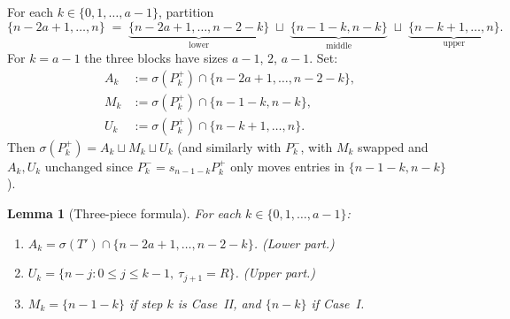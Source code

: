 \documentclass[11pt]{article}
\newtheorem{lemma}[theorem]{Lemma}
\theoremstyle{definition}
\begin{document}
For each $k\in\{0,1,\ldots,a-1\}$, partition
\[
   \{n-2a+1,\ldots,n\}\;=\;
   \underbrace{\{n-2a+1,\ldots,n-2-k\}}_{\text{lower}}
   \;\sqcup\;
   \underbrace{\{n-1-k,n-k\}}_{\text{middle}}
   \;\sqcup\;
   \underbrace{\{n-k+1,\ldots,n\}}_{\text{upper}}.
\]
For $k=a-1$ the three blocks have sizes $a-1$, $2$, $a-1$.  Set:
\begin{align}
   A_k & := \sigma(P_k^+)\cap\{n-2a+1,\ldots,n-2-k\}, \\
   M_k & := \sigma(P_k^+)\cap\{n-1-k,n-k\}, \\
   U_k & := \sigma(P_k^+)\cap\{n-k+1,\ldots,n\}.
\end{align}
Then $\sigma(P_k^+)=A_k\sqcup M_k\sqcup U_k$ (and similarly with
$P_k^-$, with $M_k$ swapped and $A_k,U_k$ unchanged since
$P_k^-=s_{n-1-k}P_k^+$ only moves entries in $\{n-1-k,n-k\}$).

\begin{lemma}[Three-piece formula]\label{lem:three-piece}
For each $k\in\{0,1,\ldots,a-1\}$:
\begin{enumerate}[leftmargin=2em,topsep=0.3em,itemsep=0.2em,label=(\roman*)]
\item $A_k=\sigma(T')\cap\{n-2a+1,\ldots,n-2-k\}$.  (Lower part.)
\item $U_k=\{n-j : 0\le j\le k-1,\ \tau_{j+1}=R\}$.  (Upper part.)
\item $M_k=\{n-1-k\}$ if step $k$ is Case~II, and $\{n-k\}$ if Case~I.
\end{enumerate}
\end{lemma}
\end{document}
